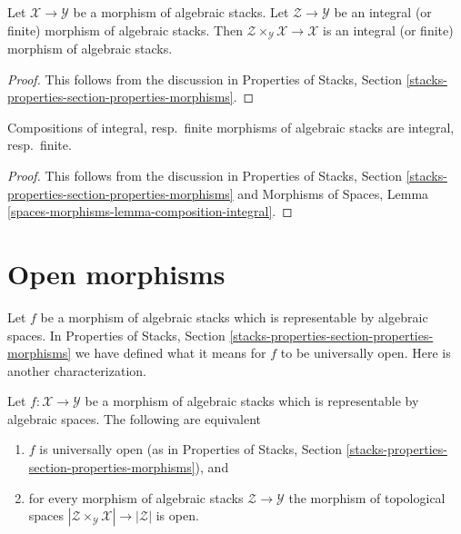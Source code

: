 \begin{lemma}
\label{lemma-base-change-integral}
Let $\mathcal{X} \to \mathcal{Y}$ be a morphism of algebraic stacks.
Let $\mathcal{Z} \to \mathcal{Y}$ be an integral (or finite)
morphism of algebraic stacks. Then
$\mathcal{Z} \times_\mathcal{Y} \mathcal{X} \to \mathcal{X}$
is an integral (or finite) morphism of algebraic stacks.
\end{lemma}

\begin{proof}
This follows from the discussion in
Properties of Stacks, Section
\ref{stacks-properties-section-properties-morphisms}.
\end{proof}

\begin{lemma}
\label{lemma-composition-integral}
Compositions of integral, resp.\ finite morphisms of algebraic stacks
are integral, resp.\ finite.
\end{lemma}

\begin{proof}
This follows from the discussion in
Properties of Stacks, Section
\ref{stacks-properties-section-properties-morphisms}
and
Morphisms of Spaces, Lemma \ref{spaces-morphisms-lemma-composition-integral}.
\end{proof}




\section{Open morphisms}
\label{section-open}

\noindent
Let $f$ be a morphism of algebraic stacks which is representable by
algebraic spaces. In
Properties of Stacks, Section
\ref{stacks-properties-section-properties-morphisms}
we have defined what it means for $f$ to be universally open.
Here is another characterization.

\begin{lemma}
\label{lemma-characterize-representable-universally-open}
Let $f : \mathcal{X} \to \mathcal{Y}$ be a morphism of
algebraic stacks which is representable by algebraic spaces.
The following are equivalent
\begin{enumerate}
\item $f$ is universally open (as in Properties of Stacks,
Section \ref{stacks-properties-section-properties-morphisms}), and
\item for every morphism of algebraic stacks $\mathcal{Z} \to \mathcal{Y}$
the morphism of topological spaces
$|\mathcal{Z} \times_\mathcal{Y} \mathcal{X}| \to |\mathcal{Z}|$ is open.
\end{enumerate}
\end{lemma}


